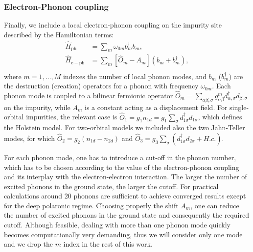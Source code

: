 \documentclass[edipack_sp.tex]{subfiles}
\begin{document}
\subsubsection{Electron-Phonon coupling}
Finally, we include a local electron-phonon coupling on the impurity site
described by the Hamiltonian terms: 
\begin{equation}\label{Hph}
  \begin{split}
    \hat{H}_\mathrm{ph}&=\sum_m \omega_{0m} b_m^\dagger b_m,   \\
    \hat{H}_\mathrm{e-ph} &= \sum_m [ \hat{O}_m - A_m](b_m+b_m^\dagger), \\
\end{split}
\end{equation}
where $m=1,\dots,M$ indexes the number of local phonon modes, and $b_m$
($b_m^\dagger$) are the destruction (creation) operators for a phonon with
frequency $\omega_{0m}$. Each phonon mode is coupled to a bilinear fermionic operator $\hat{O}_m= \sum_{\alpha \beta, \sigma }g^{m}_{\alpha \beta} d^\dagger_{\alpha, \sigma} d_{\beta, \sigma}$ on the impurity, while $A_m$ is a constant acting as a displacement field.  %
%
For single-orbital impurities, the relevant case is $\hat{O}_1 = g_1 n_{1d} = g_1 \sum_{\sigma} d^{\dagger}_{1\sigma}d_{1\sigma}$, which defines the Holstein model\cite{Holstein1959APNY}. For two-orbital models we included also the two Jahn-Teller modes\cite{Capone2010ACMP}, for which $\hat{O}_2 = g_2(n_{1d} - n_{2d})$\cite{Scazzola2023PRB} and $\hat{O}_3 = g_3 \sum_{\sigma} (d^{\dagger}_{1\sigma}d_{2\sigma}+ H.c.)$. 

For each phonon mode, one has to introduce a cut-off in the phonon number, which has to be chosen according to the value of the electron-phonon coupling\cite{Capone2003PRL,Capone2006PRB} and its interplay with the electron-electron interaction\cite{Capone2004PRL,Capone2004PRLsc,Sangiovanni2005PRB,Paci2005PRL,Sangiovanni2006PRL,Sangiovanni2006PRB_ph,Paci2006PRB}. The larger the number of excited phonons in the ground state, the larger the cutoff. For practical calculations around 20 phonons are sufficient to achieve converged results except for the deep polaronic regime\cite{Capone2003PRL}.
Choosing properly the shift $A_m$, one can reduce the number of excited phonons in the ground state and consequently the required cutoff. 
Although feasible, dealing with more than one phonon mode quickly becomes computationally very demanding, thus we will consider only one mode and we drop the $m$ index in the rest of this work.
\end{document}

